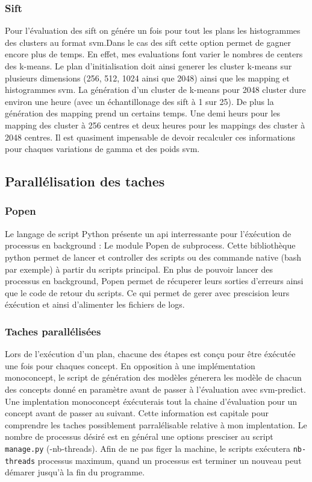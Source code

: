 \documentclass[a4paper, 11pt]{article}
\begin{document}
\subsubsection{Sift}

Pour l'évaluation des sift on génére un fois pour tout les plans les histogrammes des clusters au format svm.Dans le cas des sift cette option permet de gagner encore plus de temps. En effet, mes evaluations font varier le nombres de centers des k-means. Le plan d'initialisation doit ainsi generer les cluster k-means sur plusieurs dimensions (256, 512, 1024 ainsi que 2048) ainsi que les mapping et histogrammes svm. La génération d'un cluster de k-means pour 2048 cluster dure environ une heure (avec un échantillonage des sift à 1 sur 25). De plus la génération des mapping prend un certains temps. Une demi heurs pour les mapping des cluster à 256 centres et deux heures pour les mappings des cluster à 2048 centres. 
Il est quasiment impensable de devoir recalculer ces informations pour chaques variations de gamma et des poids svm.

\subsection{Parallélisation des taches}

\subsubsection{Popen}
Le langage de script Python présente un api interressante pour l'éxécution de processus en background : Le module Popen de subprocess. Cette bibliothèque python permet de lancer et controller des scripts ou des commande native (bash par exemple) à partir du scripts principal. En plus de pouvoir lancer des processus en background, Popen permet de récuperer leurs sorties d'erreurs ainsi que le code de retour du scripts. Ce qui permet de gerer avec prescision leurs éxécution et ainsi d'alimenter les fichiers de logs.

\subsubsection{Taches parallélisées}
Lors de l'exécution d'un plan, chacune des étapes est conçu pour être éxécutée une fois pour chaques concept. En opposition à une implémentation monoconcept, le script de génération des modèles génerera les modèle de chacun des concepts donné en paramètre avant de passer à l'évaluation avec svm-predict. Une implentation monoconcept éxécuterais tout la chaine d'évaluation pour un concept avant de passer au suivant. Cette information est capitale pour comprendre les taches possiblement parralélisable relative à mon implentation. Le nombre de processus désiré est en général une options presciser au script \texttt{manage.py} (-nb-threads). Afin de ne pas figer la machine, le scripts exécutera \texttt{nb-threads} processus maximum, quand un processus est terminer un nouveau peut démarer jusqu'à la fin du programme.  
\end{document}
